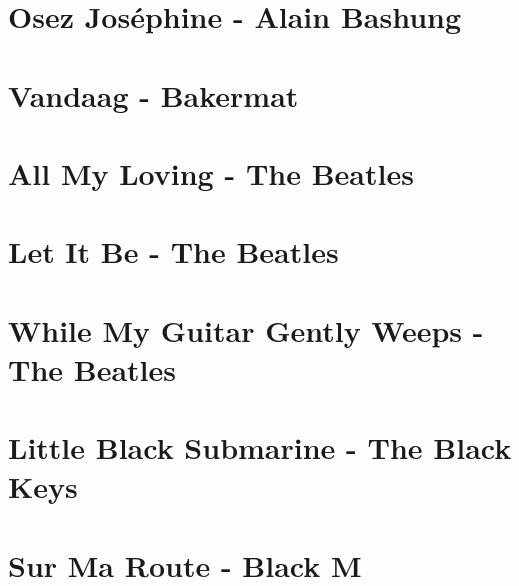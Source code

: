 \documentclass{guitartabs}
\begin{document}
\section{Osez Joséphine - Alain Bashung}
\begin{guitar}

\end{guitar}

\section{Vandaag - Bakermat}
\begin{guitar}

\end{guitar}



\section{All My Loving - The Beatles}


\section*{Let It Be - The Beatles}
\begin{guitar}

\end{guitar}

\section*{While My Guitar Gently Weeps - The Beatles}
\begin{guitar}

\end{guitar}

\section{Little Black Submarine - The Black Keys}
\begin{guitar}

\end{guitar}

\section{Sur Ma Route - Black M}
\begin{guitar}

\end{guitar}
\end{document}
